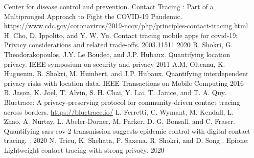 \documentclass[11pt]{article} %
\begin{document}
\begin{thebibliography}{10}
\itemsep=1pt
\begin{small}
 Center for disease control and prevention. \newblock Contact Tracing : Part of a Multipronged Approach to Fight the COVID-19 Pandemic. \newblock https://www.cdc.gov/coronavirus/2019-ncov/php/principles-contact-tracing.html
 H. Cho, D. Ippolito, and Y. W. Yu. \newblock Contact tracing mobile apps for covid-19: Privacy considerations and related trade-offs.  2003.11511 2020
 R. Shokri, G. Theodorakopoulos, J.Y. Le Boudec, and J.P. Hubaux. \newblock Quantifying location privacy. \newblock IEEE symposium on security and privacy 2011
 A.M. Olteanu, K. Huguenin, R. Shokri, M. Humbert, and J.P. Hubaux. \newblock Quantifying interdependent privacy risks with location data. \newblock IEEE Transactions on Mobile Computing 2016
 B. Jason, K. Joel, T. Alvin, S. H. Chai, Y. Lai, T. Janice, and T. A. Quy. \newblock Bluetrace: A privacy-preserving
protocol for community-driven contact tracing across borders. \newblock  \url{https://bluetrace.io/}
  L. Ferretti, C. Wymant, M. Kendall, L. Zhao, A. Nurtay, L. Abeler-Dorner, M. Parker, D. G. Bonsall, and
C. Fraser. \newblock Quantifying sars-cov-2 transmission suggests epidemic control with digital contact tracing. , 2020
 N. Trieu, K. Shehata, P. Saxena, R. Shokri, and D. Song . \newblock Epione: Lightweight contact tracing with strong privacy.  2020


\end{small}
\end{thebibliography}
\end{document}
